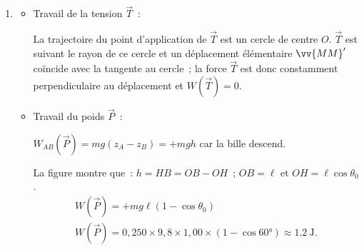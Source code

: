 \begin{enumerate}
    \item 
          \begin{itemize}
              \item Travail de la tension $\vec{T}$~:
                    
                    La trajectoire du point d'application de $\vec{T}$ est un
                    cercle de centre $O$. $\vec{T}$ est suivant le rayon de ce
                    cercle et un déplacement élémentaire $\vv{MM}^{\prime}$
                    coïncide avec la tangente au cercle~; la force $\vec{T}$ est
                    donc constamment perpendiculaire au déplacement et
                    $W(\vec{T})=0$.
              \item Travail du poids $\vec{P}$~:

                    $W_{AB}(\vec{P})=mg(z_{A}-z_{B})=+mgh$ car la bille descend.

                    La figure montre que~: $h=HB=OB-OH$~; $OB=\ell$ et
                    $OH=\ell\cos\theta_0$.
                    \begin{gather*}
                        W(\vec{P})=+mg\ell(1-\cos\theta_0) \\
                        W(\vec{P})=0,250\times9,8\times1,00\times
                        (1-\cos\ang{60})\approx\qty{1.2}{\J}.
                    \end{gather*}
          \end{itemize}
\end{enumerate}
